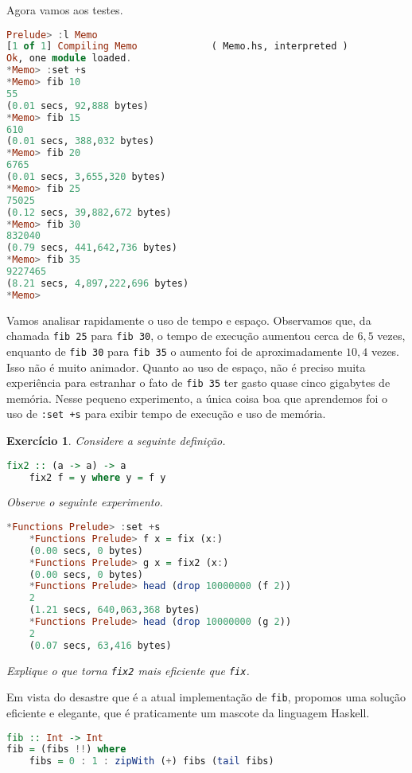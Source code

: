\documentclass[a4paper]{article}
\newtheorem{exercicio}{Exercício}
\begin{document}
Agora vamos aos testes.

\pagebreak

\begin{lstlisting}[language=haskell, frame=single]
Prelude> :l Memo
[1 of 1] Compiling Memo             ( Memo.hs, interpreted )
Ok, one module loaded.
*Memo> :set +s
*Memo> fib 10
55
(0.01 secs, 92,888 bytes)
*Memo> fib 15
610
(0.01 secs, 388,032 bytes)
*Memo> fib 20
6765
(0.01 secs, 3,655,320 bytes)
*Memo> fib 25
75025
(0.12 secs, 39,882,672 bytes)
*Memo> fib 30
832040
(0.79 secs, 441,642,736 bytes)
*Memo> fib 35
9227465
(8.21 secs, 4,897,222,696 bytes)
*Memo>
\end{lstlisting}

Vamos analisar rapidamente o uso de tempo e espaço.
Observamos que, da chamada \mbox{\texttt{fib 25}} para \texttt{fib 30}, o tempo de execução aumentou cerca de $6,5$ vezes, enquanto de \texttt{fib 30} para \mbox{\texttt{fib 35}} o aumento foi de aproximadamente $10,4$ vezes.
Isso não é muito animador.
Quanto ao uso de espaço, não é preciso muita experiência para estranhar o fato de \texttt{fib 35} ter gasto quase cinco gigabytes de memória.
Nesse pequeno experimento, a única coisa boa que aprendemos foi o uso de \texttt{:set +s} para exibir tempo de execução e uso de memória.

\begin{exercicio}	\label{exercicio:fix2}
	Considere a seguinte definição.
	\begin{lstlisting}[language=haskell, frame=single]
	fix2 :: (a -> a) -> a
	fix2 f = y where y = f y
	\end{lstlisting}
	Observe o seguinte experimento.
	\begin{lstlisting}[language=haskell, frame=single]
	*Functions Prelude> :set +s
	*Functions Prelude> f x = fix (x:)
	(0.00 secs, 0 bytes)
	*Functions Prelude> g x = fix2 (x:)
	(0.00 secs, 0 bytes)
	*Functions Prelude> head (drop 10000000 (f 2))
	2
	(1.21 secs, 640,063,368 bytes)
	*Functions Prelude> head (drop 10000000 (g 2))
	2
	(0.07 secs, 63,416 bytes)
	\end{lstlisting}
	Explique o que torna \emph{\texttt{fix2}} mais eficiente que \emph{\texttt{fix}}.
\end{exercicio}

Em vista do desastre que é a atual implementação de \texttt{fib}, propomos uma solução eficiente e elegante, que é praticamente um mascote da linguagem Haskell.

\begin{lstlisting}[language=haskell, frame=single]
fib :: Int -> Int
fib = (fibs !!) where
	fibs = 0 : 1 : zipWith (+) fibs (tail fibs)
\end{lstlisting}
\end{document}

